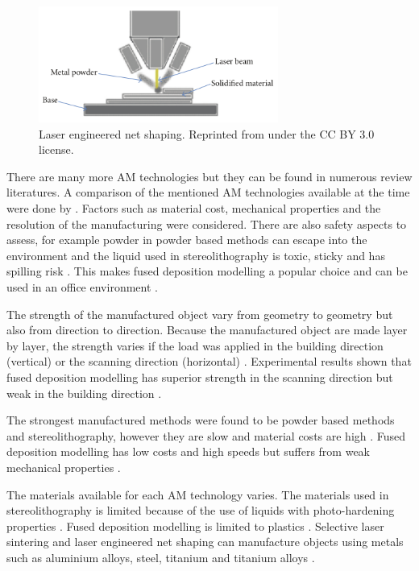 \begin{figure}
  \centering
  \includegraphics[width=0.7\textwidth]{../figures/literatureReview/literature_lens.png}
  \caption{Laser engineered net shaping. Reprinted from \citep{wong2012review} under the CC BY 3.0 license.}
  \label{fig:literature_lens}
\end{figure}

There are many more AM technologies but they can be found in numerous review literatures. A comparison of the mentioned AM technologies available at the time were done by \cite{pham1998comparison, kim2008benchmark}. Factors such as material cost, mechanical properties and the resolution of the manufacturing were considered. There are also safety aspects to assess, for example powder in powder based methods can escape into the environment and the liquid used in stereolithography is toxic, sticky and has spilling risk \citep{kim2008benchmark}. This makes fused deposition modelling a popular choice and can be used in an office environment \citep{ngo2018additive}.

The strength of the manufactured object vary from geometry to geometry but also from direction to direction. Because the manufactured object are made layer by layer, the strength varies if the load was applied in the building direction (vertical) or the scanning direction (horizontal) \citep{kim2008benchmark}. Experimental results shown that fused deposition modelling has superior strength in the scanning direction but weak in the building direction \citep{kim2008benchmark}.

The strongest manufactured methods were found to be powder based methods and stereolithography, however they are slow and material costs are high \citep{kim2008benchmark}. Fused deposition modelling has low costs and high speeds but suffers from weak mechanical properties \citep{ngo2018additive}.

The materials available for each AM technology varies. The materials used in stereolithography is limited because of the use of liquids with photo-hardening properties \citep{ngo2018additive}. Fused deposition modelling is limited to plastics \citep{ngo2018additive}. Selective laser sintering and laser engineered net shaping can manufacture objects using metals such as aluminium alloys, steel, titanium and titanium alloys \citep{herzog2016additive}.

